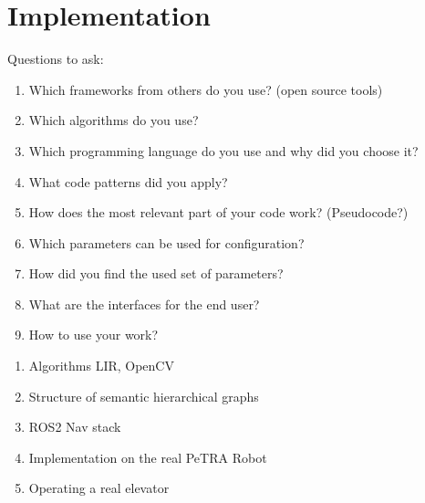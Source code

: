 \chapter{Implementation}
\label{sec:implementation}
Questions to ask:
\begin{enumerate}
    \item Which frameworks from others do you use? (open source tools)
    \item Which algorithms do you use?
    \item Which programming language do you use and why did you choose it?
    \item What code patterns did you apply?
    \item How does the most relevant part of your code work? (Pseudocode?)
    \item Which parameters can be used for configuration?
    \item How did you find the used set of parameters?   
    \item What are the interfaces for the end user?
    \item How to use your work?
\end{enumerate}

\begin{enumerate}
    \item Algorithms LIR, OpenCV
    \item Structure of semantic hierarchical graphs
    \item ROS2 Nav stack
    \item Implementation on the real PeTRA Robot
    \item Operating a real elevator 
\end{enumerate}
